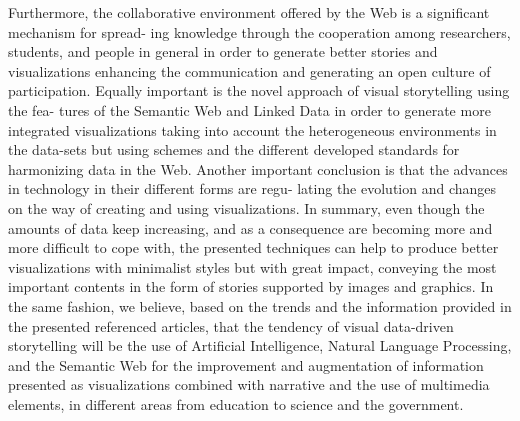 \documentclass[runningheads]{llncs}
\begin{document}
Furthermore, the collaborative environment offered by the Web is a significant mechanism for spread- ing knowledge through the cooperation among researchers, students, and people in general in order to generate better stories and visualizations enhancing the communication and generating an open culture of participation. Equally important is the novel approach of visual storytelling using the fea- tures of the Semantic Web and Linked Data in order to generate more integrated visualizations taking into account the heterogeneous environments in the data-sets but using schemes and the different developed standards for harmonizing data in the Web.
Another important conclusion is that the advances in technology in their different forms are regu- lating the evolution and changes on the way of creating and using visualizations.
In summary, even though the amounts of data keep increasing, and as a consequence are becoming more and more difficult to cope with, the presented techniques can help to produce better visualizations with minimalist styles but with great impact, conveying the most important contents in the form of stories supported by images and graphics. In the same fashion, we believe, based on the trends and the information provided in the presented referenced articles, that the tendency of visual data-driven storytelling will be the use of Artificial Intelligence, Natural Language Processing, and the Semantic Web for the improvement and augmentation of information presented as visualizations combined with narrative and the use of multimedia elements, in different areas from education to science and the government.
\end{document}
